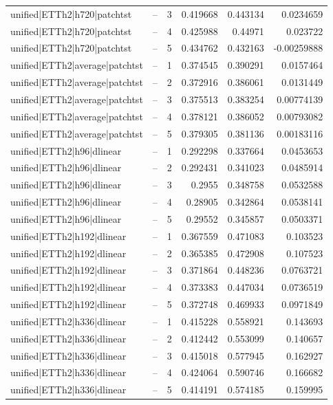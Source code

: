 \begin{longtable}{llrrrr}
unified|ETTh2|h720|patchtst & -- & 3 & 0.419668 & 0.443134 & 0.0234659 \\
unified|ETTh2|h720|patchtst & -- & 4 & 0.425988 & 0.44971 & 0.023722 \\
unified|ETTh2|h720|patchtst & -- & 5 & 0.434762 & 0.432163 & -0.00259888 \\
unified|ETTh2|average|patchtst & -- & 1 & 0.374545 & 0.390291 & 0.0157464 \\
unified|ETTh2|average|patchtst & -- & 2 & 0.372916 & 0.386061 & 0.0131449 \\
unified|ETTh2|average|patchtst & -- & 3 & 0.375513 & 0.383254 & 0.00774139 \\
unified|ETTh2|average|patchtst & -- & 4 & 0.378121 & 0.386052 & 0.00793082 \\
unified|ETTh2|average|patchtst & -- & 5 & 0.379305 & 0.381136 & 0.00183116 \\
unified|ETTh2|h96|dlinear & -- & 1 & 0.292298 & 0.337664 & 0.0453653 \\
unified|ETTh2|h96|dlinear & -- & 2 & 0.292431 & 0.341023 & 0.0485914 \\
unified|ETTh2|h96|dlinear & -- & 3 & 0.2955 & 0.348758 & 0.0532588 \\
unified|ETTh2|h96|dlinear & -- & 4 & 0.28905 & 0.342864 & 0.0538141 \\
unified|ETTh2|h96|dlinear & -- & 5 & 0.29552 & 0.345857 & 0.0503371 \\
unified|ETTh2|h192|dlinear & -- & 1 & 0.367559 & 0.471083 & 0.103523 \\
unified|ETTh2|h192|dlinear & -- & 2 & 0.365385 & 0.472908 & 0.107523 \\
unified|ETTh2|h192|dlinear & -- & 3 & 0.371864 & 0.448236 & 0.0763721 \\
unified|ETTh2|h192|dlinear & -- & 4 & 0.373383 & 0.447034 & 0.0736519 \\
unified|ETTh2|h192|dlinear & -- & 5 & 0.372748 & 0.469933 & 0.0971849 \\
unified|ETTh2|h336|dlinear & -- & 1 & 0.415228 & 0.558921 & 0.143693 \\
unified|ETTh2|h336|dlinear & -- & 2 & 0.412442 & 0.553099 & 0.140657 \\
unified|ETTh2|h336|dlinear & -- & 3 & 0.415018 & 0.577945 & 0.162927 \\
unified|ETTh2|h336|dlinear & -- & 4 & 0.424064 & 0.590746 & 0.166682 \\
unified|ETTh2|h336|dlinear & -- & 5 & 0.414191 & 0.574185 & 0.159995 \\

\end{longtable}
